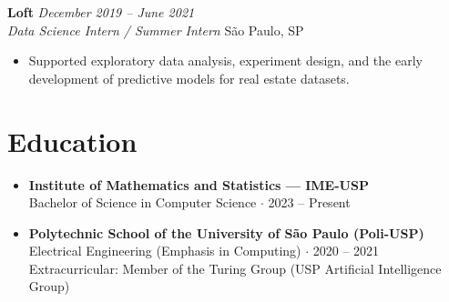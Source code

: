 \documentclass[10pt,a4paper]{article}
\newcommand{\experienceitem}[4]{
  \vspace{4pt}
  {\bfseries\color{textdark}#1} \hfill {\em #2} \\
  {\itshape\color{secondary}#3} \hfill {\small\color{gray}#4} \\[2pt]
}
\begin{document}
\experienceitem{Loft}{December 2019 -- June 2021}{Data Science Intern / Summer Intern}{São Paulo, SP}
\begin{itemize}[leftmargin=*, noitemsep, topsep=2pt]
    \item Supported exploratory data analysis, experiment design, and the early development of predictive models for real estate datasets.
\end{itemize}

\section*{Education}
\begin{itemize}[leftmargin=*, noitemsep, topsep=0pt]
    \item \textbf{Institute of Mathematics and Statistics — IME-USP} \\
    Bachelor of Science in Computer Science $\cdot$ 2023 -- Present
    \item \textbf{Polytechnic School of the University of São Paulo (Poli-USP)} \\
    Electrical Engineering (Emphasis in Computing) $\cdot$ 2020 -- 2021 \\
    {\small Extracurricular: Member of the Turing Group (USP Artificial Intelligence Group)}
\end{itemize}
\end{document}
